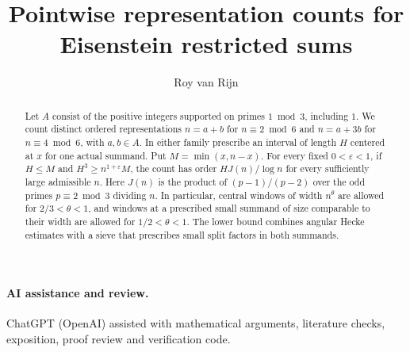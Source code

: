 \documentclass[11pt,a4paper]{article}
\title{Pointwise representation counts for Eisenstein restricted sums}
\author{Roy van Rijn}
\date{}
\begin{document}
\maketitle
\begin{abstract}
Let \(A\) consist of the positive integers supported on primes
\(1\bmod 3\), including \(1\). We count distinct ordered representations
\(n=a+b\) for \(n\equiv2\bmod6\) and \(n=a+3b\) for \(n\equiv4\bmod6\),
with \(a,b\in A\). In either family prescribe an interval of length
\(H\) centered at \(x\) for one actual summand. Put \(M=\min(x,n-x)\).
For every fixed \(0<\varepsilon<1\), if \(H\le M\) and
\(H^3\ge n^{1+\varepsilon}M\), the count has order \(HJ(n)/\log n\)
for every sufficiently large admissible \(n\). Here \(J(n)\) is the
product of \((p-1)/(p-2)\) over the odd primes \(p\equiv2\bmod3\)
dividing \(n\). In particular, central windows of width \(n^\theta\)
are allowed for \(2/3<\theta<1\), and windows at a prescribed small
summand of size comparable to their width are allowed for
\(1/2<\theta<1\). The lower bound combines angular Hecke estimates
with a sieve that prescribes small split factors in both summands.
\end{abstract}





\paragraph{AI assistance and review.}
ChatGPT (OpenAI) assisted with mathematical arguments, literature checks,
exposition, proof review and verification code.

\end{document}
